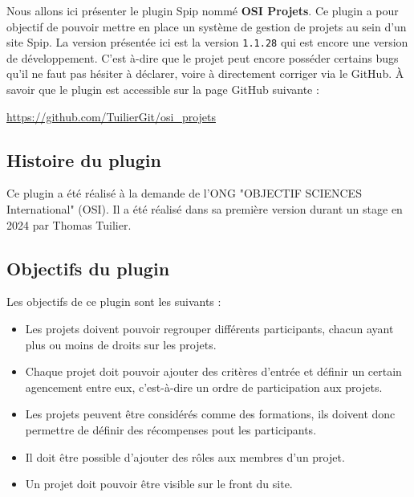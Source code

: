 Nous allons ici présenter le plugin Spip nommé \textbf{OSI Projets}. Ce plugin a pour objectif de pouvoir mettre en place un système de gestion de projets au sein d'un site Spip. La version présentée ici est la version \texttt{1.1.28} qui est encore une version de développement. C'est à-dire que le projet peut encore posséder certains bugs qu'il ne faut pas hésiter à déclarer, voire à directement corriger via le GitHub. À savoir que le plugin est accessible sur la page GitHub suivante :
\begin{center}
    \href{https://github.com/TuilierGit/osi_projets}{https://github.com/TuilierGit/osi\_projets}
\end{center}


\subsection{Histoire du plugin}

Ce plugin a été réalisé à la demande de l'ONG "OBJECTIF SCIENCES International" (OSI). Il a été réalisé dans sa première version durant un stage en 2024 par Thomas Tuilier.

\subsection{Objectifs du plugin}
Les objectifs de ce plugin sont les suivants : 
\begin{itemize}
    \item Les projets doivent pouvoir regrouper différents participants, chacun ayant plus ou moins de droits sur les projets.
    \item Chaque projet doit pouvoir ajouter des critères d’entrée et définir un certain agencement entre eux, c’est-à-dire un ordre de participation aux projets.
    \item Les projets peuvent être considérés comme des formations, ils doivent donc permettre de définir des récompenses pout les participants. 
    \item Il doit être possible d'ajouter des rôles aux membres d'un projet.
    \item Un projet doit pouvoir être visible sur le front du site.
\end{itemize}

